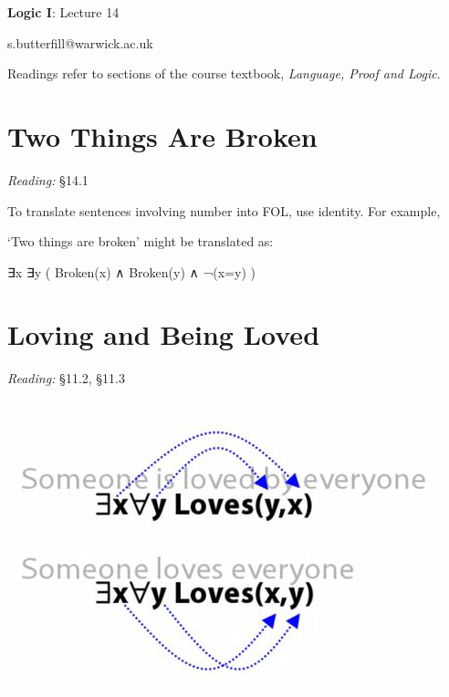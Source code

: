 \documentclass[12pt]{extarticle}
\date{}
\makeatletter
\def \ititle {Origins of Mind}
\def \isubtitle {Lecture 08}
\def \iemail{s.butterfill@warwick.ac.uk}
\makeatother
\begin{document}

\begin{multicols*}{3}

\setlength\footnotesep{1em}








\def \ititle {Logic I}
 
\def \isubtitle {Lecture 14}
 
\begin{center}
 
{\Large
 
\textbf{\ititle}: \isubtitle
 
}
 
 
 
\iemail %
 
\end{center}
 
Readings refer to sections of the course textbook, \emph{Language, Proof and Logic}.
 
 
 
\section{Two Things Are Broken}
 
\emph{Reading:} §14.1
 
To translate sentences involving number into FOL, use identity. For example,
 
`Two things are broken' might be translated as:
 
∃x ∃y ( Broken(x) ∧ Broken(y) ∧ ¬(x=y) )
 
 
 
\section{Loving and Being Loved}
 
\emph{Reading:} §11.2, §11.3
 
\begin{center}
\includegraphics[scale=0.3]{img/unit_755_loved.png}
\end{center}
 

\end{multicols*}
\end{document}
